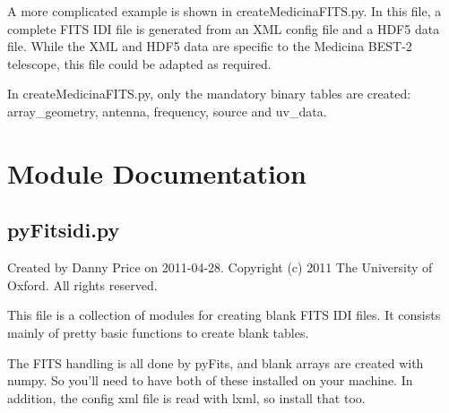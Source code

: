 \documentclass[letterpaper,10pt,english]{sphinxmanual}
\begin{document}
A more complicated example is shown in createMedicinaFITS.py. In this file, a complete FITS IDI file is generated from an XML config file and a HDF5 data file. While the XML and HDF5 data are specific to the Medicina BEST-2 telescope, this file could be adapted as required.

In createMedicinaFITS.py, only the mandatory binary tables are created: array\_geometry, antenna, frequency, source and uv\_data.


\chapter{Module Documentation}
\label{index:module-pyFitsidi}\label{index:module-documentation}

\section{pyFitsidi.py}
\label{index:pyfitsidi-py}
Created by Danny Price on 2011-04-28.
Copyright (c) 2011 The University of Oxford. All rights reserved.

This file is a collection of modules for creating blank FITS IDI files.
It consists mainly of pretty basic functions to create blank tables.

The FITS handling is all done by pyFits, and blank arrays are created
with numpy. So you'll need to have both of these installed on your machine.
In addition, the config xml file is read with lxml, so install that too.
\end{document}
